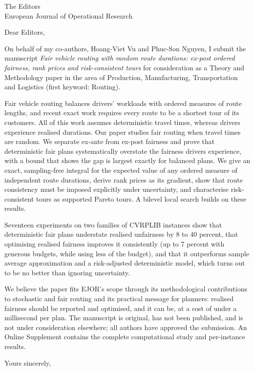 \documentclass[11pt]{letter}
\begin{document}
\begin{letter}{The Editors\\European Journal of Operational Research}
\opening{Dear Editors,}

On behalf of my co-authors, Hoang-Viet Vu and Phuc-Son Nguyen, I submit the
manuscript \emph{Fair vehicle routing with random route durations: ex-post
ordered fairness, rank prices and risk-consistent tours} for consideration as
a Theory and Methodology paper in the area of Production, Manufacturing,
Transportation and Logistics (first keyword: Routing).

Fair vehicle routing balances drivers' workloads with ordered measures of
route lengths, and recent exact work requires every route to be a shortest
tour of its customers. All of this work assumes deterministic travel times,
whereas drivers experience realised durations. Our paper studies fair routing
when travel times are random. We separate ex-ante from ex-post fairness and
prove that deterministic fair plans systematically overstate the fairness
drivers experience, with a bound that shows the gap is largest exactly for
balanced plans. We give an exact, sampling-free integral for the expected
value of any ordered measure of independent route durations, derive rank
prices as its gradient, show that route consistency must be imposed
explicitly under uncertainty, and characterise risk-consistent tours as
supported Pareto tours. A bilevel local search builds on these results.

Seventeen experiments on two families of CVRPLIB instances show that
deterministic fair plans understate realised unfairness by 8 to 40 percent,
that optimising realised fairness improves it consistently (up to 7 percent
with generous budgets, while using less of the budget), and that it
outperforms sample average approximation and a risk-adjusted deterministic
model, which turns out to be no better than ignoring uncertainty.

We believe the paper fits EJOR's scope through its methodological
contributions to stochastic and fair routing and its practical message for
planners: realised fairness should be reported and optimised, and it can be,
at a cost of under a millisecond per plan. The manuscript is original, has not
been published, and is not under consideration elsewhere; all authors have
approved the submission. An Online Supplement contains the complete
computational study and per-instance results.

\closing{Yours sincerely,}
\end{letter}
\end{document}
